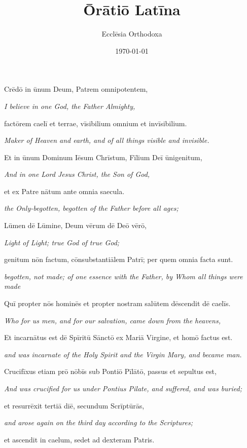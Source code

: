 \documentclass{article}
\title{Ōrātiō Latīna} %
\author{Ecclēsia Orthodoxa} %
\date{\today} %
\begin{document}
  \maketitle %
  \newpage

Crēdō in ūnum Deum, Patrem omnipotentem,

\emph{\scriptsize I believe in one God, the Father Almighty,}

factōrem caelī et terrae, vīsibilium omnium et invīsibilium.

\emph{\scriptsize Maker of Heaven and earth, and of all things visible and invisible.}

Et in ūnum Dominum Iēsum Chrīstum, Fīlium Deī ūnigenitum,

\emph{\scriptsize And in one Lord Jesus Christ, the Son of God,}

et ex Patre nātum ante omnia saecula.

\emph{\scriptsize the Only-begotten, begotten of the Father before all ages;}

Lūmen dē Lūmine, Deum vērum dē Deō vērō,

\emph{\scriptsize Light of Light; true God of true God;}

genitum nōn factum, cōnsubstantiālem Patrī; per quem omnia facta sunt.

\emph{\scriptsize begotten, not made; of one essence with the Father, by Whom all things were made}

Quī propter nōs hominēs et propter nostram salūtem dēscendit dē caelīs.

\emph{\scriptsize Who for us men, and for our salvation, came down from the heavens,}

Et incarnātus est dē Spīritū Sānctō ex Mariā Virgine, et homō factus est.

\emph{\scriptsize and was incarnate of the Holy Spirit and the Virgin Mary, and became man.}

Crucifīxus etiam prō nōbīs sub Pontiō Pīlātō, passus et sepultus est,

\emph{\scriptsize And was crucified for us under Pontius Pilate, and suffered, and was buried;}

et resurrēxit tertiā diē, secundum Scrīptūrās,

\emph{\scriptsize and arose again on the third day according to the Scriptures;}

et ascendit in caelum, sedet ad dexteram Patris.
\end{document}
